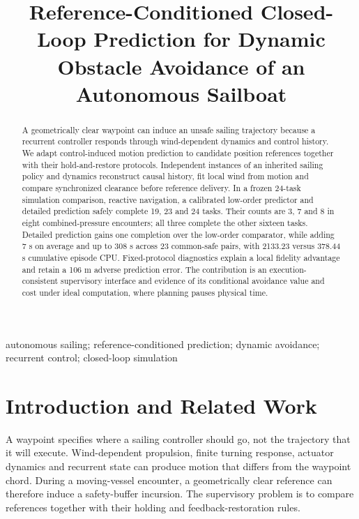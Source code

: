 \documentclass[conference]{IEEEtran}
\begin{document}
\title{Reference-Conditioned Closed-Loop Prediction for Dynamic Obstacle Avoidance of an Autonomous Sailboat}

\author{}
\maketitle

\begin{abstract}
A geometrically clear waypoint can induce an unsafe sailing trajectory because a recurrent controller responds through wind-dependent dynamics and control history. We adapt control-induced motion prediction to candidate position references together with their hold-and-restore protocols. Independent instances of an inherited sailing policy and dynamics reconstruct causal history, fit local wind from motion and compare synchronized clearance before reference delivery. In a frozen 24-task simulation comparison, reactive navigation, a calibrated low-order predictor and detailed prediction safely complete 19, 23 and 24 tasks. Their counts are 3, 7 and 8 in eight combined-pressure encounters; all three complete the other sixteen tasks. Detailed prediction gains one completion over the low-order comparator, while adding 7 s on average and up to 308 s across 23 common-safe pairs, with 2133.23 versus 378.44 s cumulative episode CPU. Fixed-protocol diagnostics explain a local fidelity advantage and retain a 106 m adverse prediction error. The contribution is an execution-consistent supervisory interface and evidence of its conditional avoidance value and cost under ideal computation, where planning pauses physical time.
\end{abstract}

\begin{IEEEkeywords}autonomous sailing; reference-conditioned prediction; dynamic avoidance; recurrent control; closed-loop simulation\end{IEEEkeywords}

\section{Introduction and Related Work}

A waypoint specifies where a sailing controller should go, not the trajectory that it will execute. Wind-dependent propulsion, finite turning response, actuator dynamics and recurrent state can produce motion that differs from the waypoint chord. During a moving-vessel encounter, a geometrically clear reference can therefore induce a safety-buffer incursion. The supervisory problem is to compare references together with their holding and feedback-restoration rules.
\end{document}
